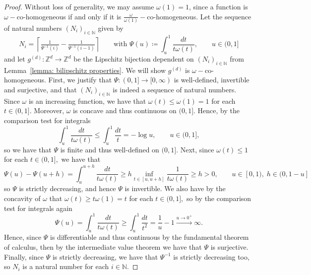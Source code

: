 \documentclass[10pt,a4paper]{amsart}
\newcommand{\N}{\mathbb{N}}
\newcommand{\Z}{\mathbb{Z}}
\begin{document}
\begin{proof}
Without loss of generality, we may assume $\omega(1) = 1$, since a function is $\omega-$co-homogeneous if and only if it is $\frac{\omega}{\omega(1)}-$co-homogeneous. Let the sequence of natural numbers $(N_i)_{i \in \N}$ given by
$$N_i = \left\lceil \tfrac{1}{\Psi^{-1}(i)}-\tfrac{1}{\Psi^{-1}(i-1)}\right\rceil \qquad \text{with } \Psi(u)\coloneqq \int_{u}^{1}\frac{dt}{t \omega(t)}, \qquad u \in (0,1]$$
and let $g^{(d)}:\Z^d \to \Z^d$ be the Lipschitz bijection  dependent on $(N_i)_{i \in \N}$ from Lemma~\ref{lemma: bilipschitz properties}.
We will show $g^{(d)}$ is $\omega-$co-homogeneous. 
    First, we justify that $\Psi:(0,1] \to [0,\infty)$ is well-defined, invertible and surjective, and that $(N_i)_{i \in \N}$ is indeed a sequence of natural numbers. Since $\omega$ is an increasing function, we have that $\omega(t) \leq \omega(1) = 1$ for each $t \in (0,1].$ Moreover, $\omega$ is concave and thus continuous on $(0,1]$. Hence, by the comparison test for integrals $$\int_u^1 \frac{dt}{t\omega(t)} \leq \int_u^1 \frac{dt}{t} = -\log u, \qquad u \in (0,1],$$ so we have that $\Psi$ is finite and thus well-defined on $(0,1]$. Next, since $\omega(t) \leq 1$ for each $t \in (0,1],$ we have that
    $$\Psi(u)-\Psi(u+h) = \int_u^{u+h} \frac{dt}{t\omega(t)} \geq h\inf_{t \in [u,u+h]}\frac{1}{t\omega(t)} \geq h>0, \qquad u \in [0,1),\;h\in (0,1-u]$$
    so $\Psi$ is strictly decreasing, and hence $\Psi$ is invertible. We also have by the concavity of $\omega$ that $\omega(t) \geq t\omega(1)=t$ for each $t \in (0,1],$ so by the comparison test for integrals again
    $$\Psi(u) =\int_u^1 \frac{dt}{t\omega(t)} \geq \int_u^1 \frac{dt}{t^2} = \frac{1}{u}-1 \xrightarrow{u \to 0^+}\infty.$$ Hence, since $\Psi$ is differentiable and thus continuous by the fundamental theorem of calculus, then by the intermediate value theorem we have that $\Psi$ is surjective.
    Finally, since $\Psi$ is strictly decreasing, we have that $\Psi^{-1}$ is strictly decreasing too, so $N_i$ is a natural number for each $i \in \N.$


\end{proof}
\end{document}
